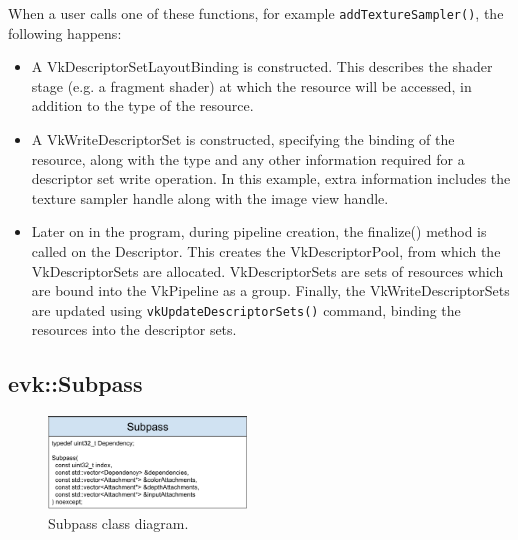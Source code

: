 \documentclass[12pt]{report}
\newcommand{\figurewidth}{0.55\textwidth}
\newcommand{\imagewidth}{0.47\textwidth}
\theoremstyle{definition}
\begin{document}
        When a user calls one of these functions, for example
        \texttt{addTextureSampler()}, the following happens:

        \begin{itemize}
          \item A VkDescriptorSetLayoutBinding is constructed. This describes
            the shader stage (e.g. a fragment shader) at which the resource
            will be accessed, in addition to the type of the resource.
          \item A VkWriteDescriptorSet is constructed, specifying the binding
            of the resource, along with the type and any other information
            required for a descriptor set write operation. In this example,
            extra information includes the texture sampler handle along with
            the image view handle.
          \item Later on in the program, during pipeline creation, the
            finalize() method is called on the Descriptor. This creates the
            VkDescriptorPool, from which the VkDescriptorSets are allocated.
            VkDescriptorSets are sets of resources which are bound into the
            VkPipeline as a group. Finally, the VkWriteDescriptorSets are
            updated using \texttt{vkUpdateDescriptorSets()} command, binding the
            resources into the descriptor sets.
        \end{itemize}

      \subsection{evk::Subpass}

        \begin{figure}
          \centering
          \includegraphics[width=\imagewidth]{images/class_subpass.png}
          \caption{Subpass class diagram.}
          \label{fig:class_subpass}
        \end{figure}
\end{document}
